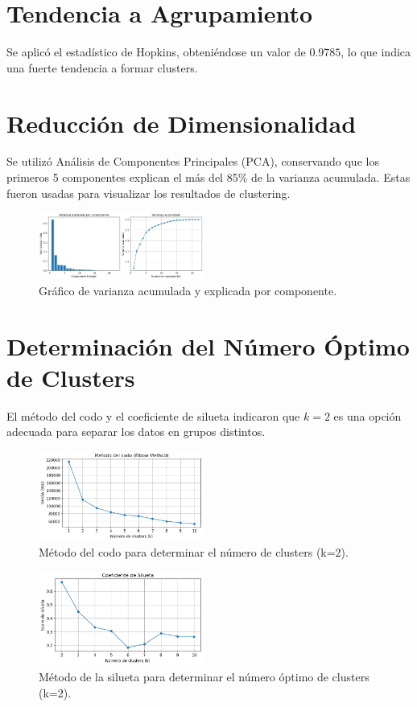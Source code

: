 \documentclass[conference]{IEEEtran}
\begin{document}
\section{Tendencia a Agrupamiento}
Se aplicó el estadístico de Hopkins, obteniéndose un valor de $0.9785$, lo que indica una fuerte tendencia a formar clusters.
\section{Reducción de Dimensionalidad}
Se utilizó Análisis de Componentes Principales (PCA), conservando que los primeros 5 componentes explican el más del 85\% de la varianza acumulada. Estas fueron usadas para visualizar los resultados de clustering.
\begin{figure}[htbp]
    \centering
    \includegraphics[width=0.48\textwidth]{images/varianza_acumulada.png}
    \caption{Gráfico de varianza acumulada y explicada por componente.}
    \label{fig:pca}
\end{figure}

\section{Determinación del Número Óptimo de Clusters}
El método del codo y el coeficiente de silueta indicaron que $k=2$ es una opción adecuada para separar los datos en grupos distintos.

\begin{figure}[htbp]
    \centering
    \includegraphics[width=0.48\textwidth]{images/elbow.png}
    \caption{Método del codo para determinar el número de clusters (k=2).}
    \label{fig:elbow}
\end{figure}

\begin{figure}[htbp]
    \centering
    \includegraphics[width=0.48\textwidth]{images/silueta.png}
    \caption{Método de la silueta para determinar el número óptimo de clusters (k=2).}
    \label{fig:silueta}
\end{figure}
\end{document}
